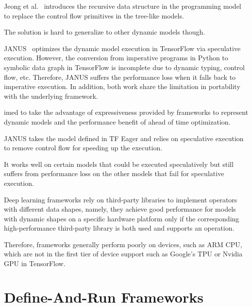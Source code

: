     Jeong et al.~\citep{jeong2018improving} introduces the recursive data structure
     in the programming model to replace the control flow primitives in the tree-like models.

     The solution is hard to generalize to other dynamic models though.

     JANUS~\citep{jeong2019janus} optimizes the dynamic model execution in
     TensorFlow via speculative execution. However, the conversion from imperative programs
     in Python to symbolic data graph in TensorFlow is incomplete due to dynamic typing,
     control flow, etc. Therefore, JANUS suffers the performance loss when it
     falls back to imperative execution. In addition, both work share the limitation
     in portability with the underlying framework.


    imed to take the advantage of expressiveness provided by frameworks to represent
    dynamic models and the performance benefit of ahead of time optimization.

    JANUS takes the model defined in TF Eager and relies on speculative execution
    to remove control flow for speeding up the execution.

    It works well on certain models that could be executed speculatively but
    still suffers from performance loss on the other models that fail for
    speculative execution.

    Deep learning frameworks rely on third-party libraries to implement
    operators with different data shapes, namely, they achieve good performance
    for models with dynamic shapes on a specific hardware platform only
    if the corresponding high-performance third-party library
    is both used and supports an operation.

    Therefore, frameworks generally perform poorly on devices,
    such as ARM CPU, which are not in the first tier of device
    support such as Google's TPU or Nvidia GPU in TensorFlow.

\section{Define-And-Run Frameworks}

